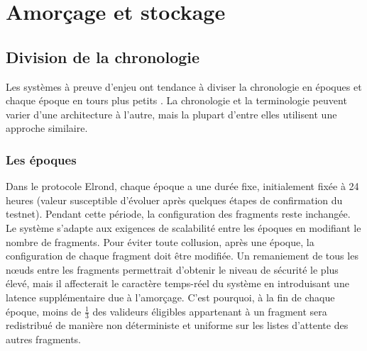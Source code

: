 \documentclass[journal]{IEEEtran}
\begin{document}
\section{Amorçage et stockage}
\label{Amor}

\subsection{Division de la chronologie} 
\label{Amor1}
Les systèmes à preuve d'enjeu ont tendance à diviser la chronologie en époques et chaque époque en tours plus petits \cite{19}. La chronologie et la terminologie peuvent varier d'une architecture à l'autre, mais la plupart d'entre elles utilisent une approche similaire.

\subsubsection{Les époques} 
Dans le protocole Elrond, chaque époque a une durée fixe, initialement fixée à 24 heures (valeur susceptible d'évoluer après quelques étapes de confirmation du testnet). Pendant cette période, la configuration des fragments reste inchangée. Le système s'adapte aux exigences de scalabilité entre les époques en modifiant le nombre de fragments. Pour éviter toute collusion, après une époque, la configuration de chaque fragment doit être modifiée. Un remaniement de tous les nœuds entre les fragments permettrait d'obtenir le niveau de sécurité le plus élevé, mais il affecterait le caractère temps-réel du système en introduisant une latence supplémentaire due à l'amorçage. C'est pourquoi, à la fin de chaque époque, moins de $\frac{1}{3}$ des valideurs éligibles appartenant à un fragment sera redistribué de manière non déterministe et uniforme sur les listes d'attente des autres fragments.
\end{document}

